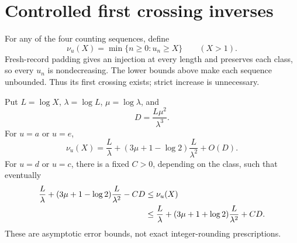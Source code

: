 \section{Controlled first crossing inverses}\label{sec:inverse}
For any of the four counting sequences, define
\[
 \nu_u(X)=\min\{n\ge0:u_n\ge X\}\qquad(X>1).
\]
Fresh-record padding gives an injection at every length and preserves each class, so every $u_n$ is nondecreasing. The lower bounds above make each sequence unbounded. Thus its first crossing exists; strict increase is unnecessary.

\begin{theorem}\label{thm:inverse}
Put $L=\log X$, $\lambda=\log L$, $\mu=\log\lambda$, and
\[
 D=\frac{L\mu^2}{\lambda^3}.
\]
For $u=a$ or $u=e$,
\begin{equation}\label{eq:inverseexact}
 \nu_u(X)=\frac L\lambda
       +(3\mu+1-\log2)\frac L{\lambda^2}+O(D).
\end{equation}
For $u=d$ or $u=c$, there is a fixed $C>0$, depending on the class, such that eventually
\begin{align}
 \frac L\lambda+(3\mu+1-\log2)\frac L{\lambda^2}-CD
 &\le\nu_u(X)\notag\\
 &\le\frac L\lambda+(3\mu+1+\log2)\frac L{\lambda^2}+CD.
 \label{eq:inversebracket}
\end{align}
These are asymptotic error bounds, not exact integer-rounding prescriptions.
\end{theorem}
